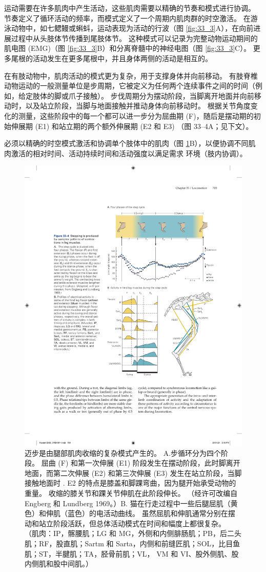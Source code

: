 运动需要在许多肌肉中产生活动，这些肌肉需要以精确的节奏和模式进行协调。
节奏定义了循环活动的频率，而模式定义了一个周期内肌肉群的时空激活。
在游泳动物中，如七鳃鳗或蝌蚪，运动表现为活动的行波（图 \ref{fig:33_3}A），在向前进展过程中从头肢体节传播到尾肢体节。
这种模式可以记录为完整动物运动期间的肌电图 (EMG)（图 \ref{fig:33_3}B）和分离脊髓中的神经电图（图 \ref{fig:33_3}C）。
更多尾根的活动发生在更多尾根中，并且身体两侧的活动是相互的。


在有肢动物中，肌肉活动的模式更为复杂，用于支撑身体并向前移动。
有肢脊椎动物运动的一般测量单位是步周期，它被定义为任何两个连续事件之间的时间（例如，给定肢体的脚或爪子接触）。
步伐周期分为摆动阶段，当脚离开地面并向前移动时，以及站立阶段，当脚与地面接触并推动身体向前移动时。
根据关节角度变化的测量，这些阶段中的每一个都可以进一步分为屈曲期 (F)，随后是摆动期的初始伸展期 (E1) 和站立期的两个额外伸展期 (E2 和 E3) （图 33–4A；见下文）。


必须以精确的时空模式激活和协调单个肢体中的肌肉（图 \ref{fig:33_4}B），以便协调不同肌肉激活的相对时间、活动持续时间和活动强度以满足需求 环境（肢内协调）。


\begin{figure}[htbp]
	\centering
	\includegraphics[width=0.65\linewidth]{chap33/fig_33_4}
	\caption{迈步是由腿部肌肉收缩的复杂模式产生的。 A.步循环分为四个阶段。 屈曲 (F) 和第一次伸展 (E1) 阶段发生在摆动阶段，此时脚离开地面，而第二次伸展 (E2) 和第三次伸展 (E3) 发生在站立阶段，当脚接触地面时 . E2 的特点是膝盖和脚踝弯曲，因为腿开始承受动物的重量。 收缩的膝关节和踝关节伸肌在此阶段伸长。 （经许可改编自 Engberg 和 Lundberg 1969。）B. 猫在行走过程中一些后腿屈肌（黄色）和伸肌（蓝色）的电活动曲线。 虽然屈肌和伸肌通常分别在摆动和站立阶段活跃，但总体活动模式在时间和幅度上都很复杂。 （肌肉：IP，髂腰肌；LG 和 MG，外侧和内侧腓肠肌；PB，后二头肌；RF，股直肌；Sartm 和 Sarta，内侧和前缝匠肌；SOL，比目鱼肌；ST，半腱肌；TA，胫骨前肌；VL， VM 和 VI、股外侧肌、股内侧肌和股中间肌。）}
	\label{fig:33_4}
\end{figure}



